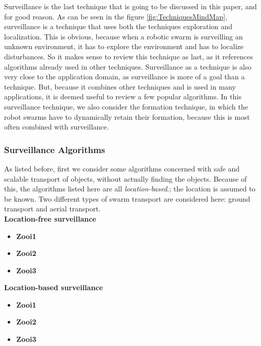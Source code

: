 
Surveillance is the last technique that is going to be discussed in this paper, and for good reason. 
As can be seen in the figure \ref{fig:TechniquesMindMap}, surveillance is a technique that uses both the techniques exploration and localization.
This is obvious, because when a robotic swarm is surveilling an unknown environment, it has to explore the environment and has to localize disturbances.
So it makes sense to review this technique as last, as it references algorithms already used in other techniques.  
Surveillance as a technique is also very close to the application domain, as surveillance is more of a goal than a technique. 
But, because it combines other techniques and is used in many applications, it is deemed useful to review a few popular algorithms. 
In this surveillance technique, we also consider the formation technique, in which the robot swarms have to dynamically retain their formation, because this is most often combined with surveillance. 

\subsubsection{Surveillance Algorithms}
As listed before, first we consider some algorithms concerned with safe and scalable transport of objects, without actually finding the objects. Because of this, the algorithms listed here are all \emph{location-based}.; the location is assumed to be known. 
Two different types of swarm transport are considered here: ground transport and aerial transport. \\

\textbf{Location-free surveillance}
\begin{itemize}
\item \textbf{Zooi1}\\
\item \textbf{Zooi2}\\
\item \textbf{Zooi3}\\
\end{itemize}

\textbf{Location-based surveillance}
\begin{itemize}
\item \textbf{Zooi1}\\
\item \textbf{Zooi2}\\
\item \textbf{Zooi3}\\
\end{itemize}

